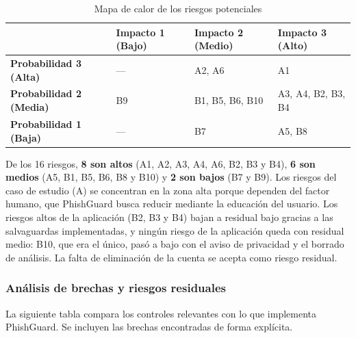 \documentclass[journal,onecolumn,12pt,draftclsnofoot]{IEEEtran}
\begin{document}
\begin{table}[htbp]
\centering
\caption{Mapa de calor de los riesgos potenciales}\label{tab:mapa}
\small
\renewcommand{\arraystretch}{1.4}
\setlength{\tabcolsep}{4pt}
\begin{tabular}{|>{\centering\arraybackslash}p{}|>{\centering\arraybackslash}p{}|>{\centering\arraybackslash}p{}|>{\centering\arraybackslash}p{}|}
\hline
 & \textbf{Impacto 1 (Bajo)} & \textbf{Impacto 2 (Medio)} & \textbf{Impacto 3 (Alto)} \\ \hline
\textbf{Probabilidad 3 (Alta)} & \cellcolor{riesgomedio}--- & \cellcolor{riesgoalto}A2, A6 & \cellcolor{riesgoalto}A1 \\ \hline
\textbf{Probabilidad 2 (Media)} & \cellcolor{riesgobajo}B9 & \cellcolor{riesgomedio}B1, B5, B6, B10 & \cellcolor{riesgoalto}A3, A4, B2, B3, B4 \\ \hline
\textbf{Probabilidad 1 (Baja)} & \cellcolor{riesgobajo}--- & \cellcolor{riesgobajo}B7 & \cellcolor{riesgomedio}A5, B8 \\ \hline
\end{tabular}
\end{table}

\noindent De los 16 riesgos, \textbf{8 son altos} (A1, A2, A3, A4, A6, B2, B3 y B4), \textbf{6 son medios} (A5, B1, B5, B6, B8 y B10) y \textbf{2 son bajos} (B7 y B9). Los riesgos del caso de estudio (A) se concentran en la zona alta porque dependen del factor humano, que PhishGuard busca reducir mediante la educación del usuario. Los riesgos altos de la aplicación (B2, B3 y B4) bajan a residual bajo gracias a las salvaguardas implementadas, y ningún riesgo de la aplicación queda con residual medio: B10, que era el único, pasó a bajo con el aviso de privacidad y el borrado de análisis. La falta de eliminación de la cuenta se acepta como riesgo residual.

\subsubsection{Análisis de brechas y riesgos residuales}\label{sec:gap}

La siguiente tabla compara los controles relevantes con lo que implementa PhishGuard. Se incluyen las brechas encontradas de forma explícita.
\end{document}
